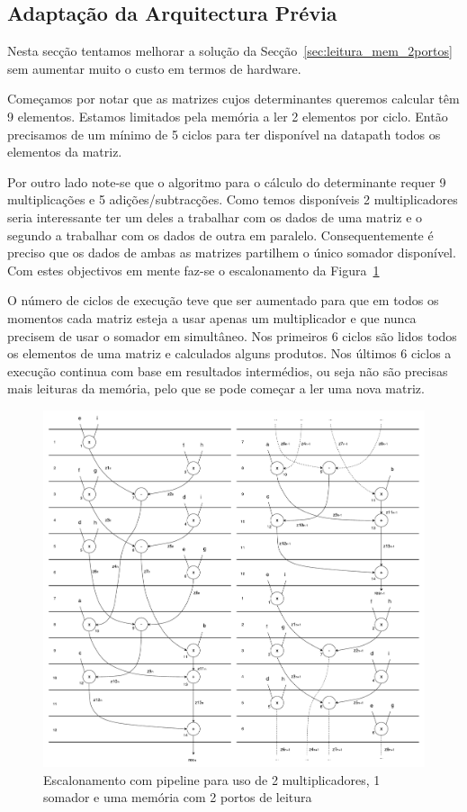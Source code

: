 \documentclass[a4paper]{article}
\begin{document}
\subsection{Adaptação da Arquitectura Prévia}
\label{subsec:arqui_2portRAM_pipelined_lessHW}

Nesta secção tentamos melhorar a solução da Secção~\ref{sec:leitura_mem_2portos} sem aumentar muito o custo em termos de hardware.

Começamos por notar que as matrizes cujos determinantes queremos calcular têm 9 elementos. Estamos limitados pela memória a ler 2 elementos por ciclo. Então precisamos de um mínimo de 5 ciclos para ter disponível na datapath todos os elementos da matriz.

Por outro lado note-se que o algoritmo para o cálculo do determinante requer 9 multiplicações e 5 adições/subtracções. Como temos disponíveis 2 multiplicadores seria interessante ter um deles a trabalhar com os dados de uma matriz e o segundo a trabalhar com os dados de outra em paralelo. Consequentemente é preciso que os dados de ambas as matrizes partilhem o único somador disponível. Com estes objectivos em mente faz-se o escalonamento da Figura~\ref{fig:scheduling_2portRAM_pipelined_lessHW}

O número de ciclos de execução teve que ser aumentado para que em todos os momentos cada matriz esteja a usar apenas um multiplicador e que nunca precisem de usar o somador em simultâneo. Nos primeiros 6 ciclos são lidos todos os elementos de uma matriz e calculados alguns produtos. Nos últimos 6 ciclos a execução continua com base em resultados intermédios, ou seja não são precisas mais leituras da memória, pelo que se pode começar a ler uma nova matriz.

\begin{figure}[h]
\centerline{\includegraphics[width=\paperwidth]{scheduling_2portRAM_pipelined_lessHW}}
\caption{Escalonamento com pipeline para uso de 2 multiplicadores, 1 somador e uma memória com 2 portos de leitura}
\label{fig:scheduling_2portRAM_pipelined_lessHW}
\end{figure}
\end{document}
